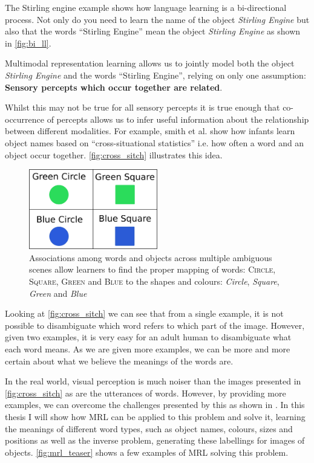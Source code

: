The Stirling engine example shows how language learning is a bi-directional process. Not only do you need to learn the name of the object \textit{Stirling Engine} but also that the words ``Stirling Engine'' mean the object \textit{Stirling Engine} as shown in \autoref{fig:bi_ll}. 

Multimodal representation learning allows us to jointly model both the object \textit{Stirling Engine} and the words ``Stirling Engine'', relying on only one assumption: \textbf{Sensory percepts which occur together are related}.

Whilst this may not be true for all sensory percepts it is true enough that co-occurrence of percepts allows us to infer useful information about the relationship between different modalities. For example, smith et al. \cite{smith2008infants} show how infants learn object names based on ``cross-situational statistics'' i.e. how often a word and an object occur together. \autoref{fig:cross_sitch} illustrates this idea.

\begin{figure}[h]
\centering
\includegraphics[width=0.5\textwidth]{Figs/introduction/shapes.png}
\caption{Associations among words and objects across multiple ambiguous scenes allow learners to find the proper mapping of words:
\textsc{Circle}, \textsc{Square}, \textsc{Green} and \textsc{Blue} to the shapes and colours: \textit{Circle},  \textit{Square},  \textit{Green} and \textit{Blue}}
\label{fig:cross_sitch}
\end{figure}

Looking at \autoref{fig:cross_sitch} we can see that from a single example, it is not possible to disambiguate which word refers to which part of the image. However, given two examples, it is very easy for an adult human to disambiguate what each word means. As we are given more examples, we can be more and more certain about what we believe the meanings of the words are. 

In the real world, visual perception is much noiser than the images presented in \autoref{fig:cross_sitch} as are the utterances of words. However, by providing more examples, we can overcome the challenges presented by this as shown in \cite{yurovsky2013statistical}. In this thesis I will show how \ac{MRL} can be applied to this problem and solve it, learning the meanings of different word types, such as object names, colours, sizes and positions as well as the inverse problem, generating these labellings for images of objects. \autoref{fig:mrl_teaser} shows a few examples of \ac{MRL} solving this problem.

